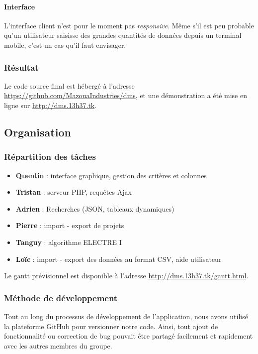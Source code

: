 \documentclass[a4paper]{article}
\begin{document}
\paragraph{Interface} L'interface client n'est pour le moment pas \textit{responsive}. Même s'il est peu probable qu'un utilisateur saisisse des grandes quantités de données depuis un terminal mobile, c'est un cas qu'il faut envisager.

\subsubsection{Résultat}

Le code source final est hébergé à l'adresse \url{https://github.com/MazouaIndustries/dms}, et une démonstration a été mise en ligne sur \url{http://dms.13h37.tk}.

\newpage

\subsection{Organisation}

\subsubsection{Répartition des tâches}

\begin{itemize}
\item \textbf{Quentin} : interface graphique, gestion des critères et colonnes
\item \textbf{Tristan} : serveur PHP, requêtes Ajax
\item \textbf{Adrien} : Recherches (JSON, tableaux dynamiques)
\item \textbf{Pierre} : import - export de projets
\item \textbf{Tanguy} : algorithme ELECTRE I
\item \textbf{Loïc} : import - export des données au format CSV, aide utilisateur
\end{itemize}

Le gantt prévisionnel est disponible à l'adresse
\url{http://dms.13h37.tk/gantt.html}.

\subsubsection{Méthode de développement}

Tout au long du processus de développement de l'application, nous avons utilisé la plateforme GitHub pour versionner notre code. Ainsi, tout ajout de fonctionnalité ou correction de bug pouvait être partagé facilement et rapidement avec les autres membres du groupe.
\end{document}
